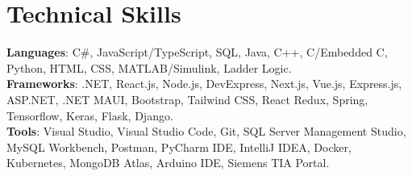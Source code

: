 \documentclass[letterpaper,11pt]{article}
\begin{document}
\section{Technical Skills}
 \begin{itemize}[leftmargin=0.15in, label={}]
    \small{\item{
     \textbf{Languages}{: \mbox{C{\#}}, JavaScript/TypeScript, SQL, Java, C++, C/Embedded C, Python, HTML, CSS, MATLAB/Simulink, Ladder Logic.} \\
     \textbf{Frameworks}{: .NET, React.js, Node.js, DevExpress, Next.js, Vue.js, Express.js, ASP.NET, .NET MAUI, Bootstrap, Tailwind CSS, React Redux, Spring, Tensorflow, Keras, Flask, Django.} \\
     \textbf{Tools}{: Visual Studio, Visual Studio Code, Git, SQL Server Management Studio, MySQL Workbench, Postman, PyCharm IDE, IntelliJ IDEA, Docker, Kubernetes, MongoDB Atlas, Arduino IDE, Siemens TIA Portal.} }}
 \end{itemize}
 \vspace{-16pt}
\end{document}
